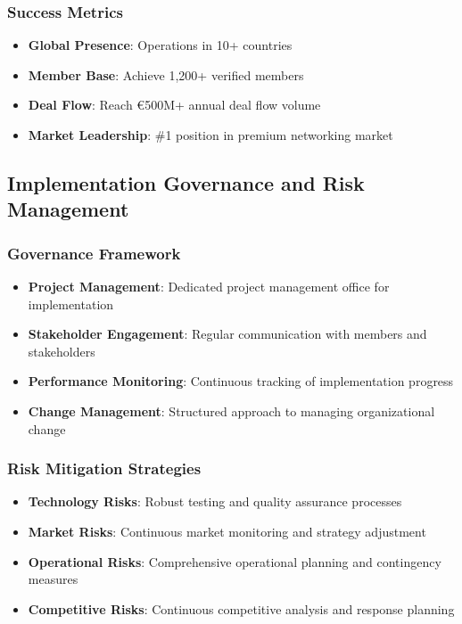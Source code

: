 \subsubsection{Success Metrics}
\begin{itemize}
    \item \textbf{Global Presence}: Operations in 10+ countries
    \item \textbf{Member Base}: Achieve 1,200+ verified members
    \item \textbf{Deal Flow}: Reach €500M+ annual deal flow volume
    \item \textbf{Market Leadership}: \#1 position in premium networking market
\end{itemize}

\subsection{Implementation Governance and Risk Management}

\subsubsection{Governance Framework}
\begin{itemize}
    \item \textbf{Project Management}: Dedicated project management office for implementation
    \item \textbf{Stakeholder Engagement}: Regular communication with members and stakeholders
    \item \textbf{Performance Monitoring}: Continuous tracking of implementation progress
    \item \textbf{Change Management}: Structured approach to managing organizational change
\end{itemize}

\subsubsection{Risk Mitigation Strategies}
\begin{itemize}
    \item \textbf{Technology Risks}: Robust testing and quality assurance processes
    \item \textbf{Market Risks}: Continuous market monitoring and strategy adjustment
    \item \textbf{Operational Risks}: Comprehensive operational planning and contingency measures
    \item \textbf{Competitive Risks}: Continuous competitive analysis and response planning
\end{itemize}

